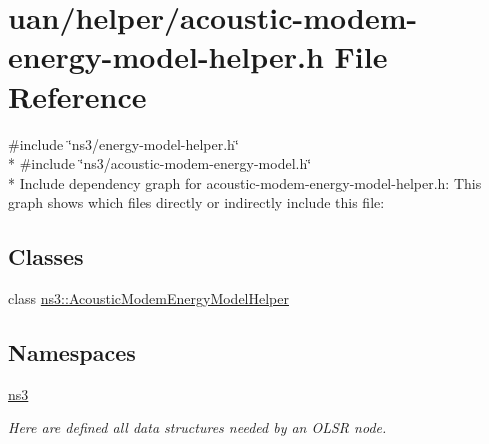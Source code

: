 \hypertarget{acoustic-modem-energy-model-helper_8h}{}\section{uan/helper/acoustic-\/modem-\/energy-\/model-\/helper.h File Reference}
\label{acoustic-modem-energy-model-helper_8h}
{\ttfamily \#include \char`\"{}ns3/energy-\/model-\/helper.\+h\char`\"{}}\\*
{\ttfamily \#include \char`\"{}ns3/acoustic-\/modem-\/energy-\/model.\+h\char`\"{}}\\*
Include dependency graph for acoustic-\/modem-\/energy-\/model-\/helper.h\+:
This graph shows which files directly or indirectly include this file\+:
\subsection*{Classes}
\begin{DoxyCompactItemize}
\item 
class \hyperlink{classns3_1_1AcousticModemEnergyModelHelper}{ns3\+::\+Acoustic\+Modem\+Energy\+Model\+Helper}
\end{DoxyCompactItemize}
\subsection*{Namespaces}
\begin{DoxyCompactItemize}
\item 
 \hyperlink{namespacens3}{ns3}
\begin{DoxyCompactList}\small\item\em Here are defined all data structures needed by an O\+L\+SR node. \end{DoxyCompactList}\end{DoxyCompactItemize}
